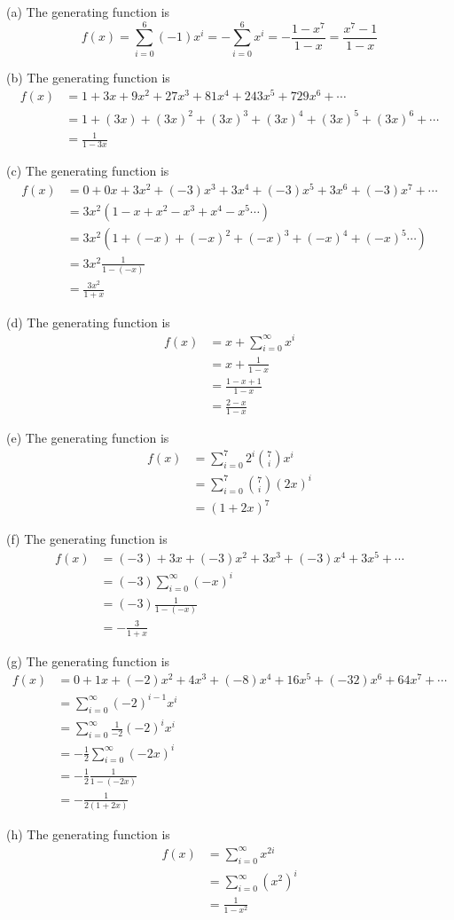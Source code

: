 
(a) The generating function is
\[
f(x)
= \sum_{i=0}^6 (-1)x^i
= -\sum_{i=0}^6 x^i
= -\frac{1 - x^7}{1 - x} 
= \frac{x^7 - 1}{1 - x} 
\]

(b) The generating function is
\begin{align*}
  f(x) &= 1 + 3x + 9x^2 + 27x^3 + 81x^4 + 243x^5 + 729x^6 + \cdots \\
  &= 1 + (3x) + (3x)^2 + (3x)^3 + (3x)^4 + (3x)^5 + (3x)^6 + \cdots \\
  &= \frac{1}{1 - 3x}
\end{align*}

(c) The generating function is
\begin{align*}
  f(x)
  &= 0 + 0x + 3x^2 + (-3)x^3 + 3x^4 + (-3)x^5 + 3x^6 + (-3)x^7 + \cdots\\
  &= 3x^2 (1 - x + x^2 - x^3 + x^4 - x^5 \cdots) \\
  &= 3x^2 (1 + (-x) + (-x)^2 + (-x)^3 + (-x)^4 + (-x)^5 \cdots) \\
  &= 3x^2 \frac{1}{1 - (-x)} \\
  &= \frac{3x^2}{1 + x} 
\end{align*}


(d) The generating function is
\begin{align*}
  f(x)
  &= x + \sum_{i=0}^\infty x^i \\
  &= x + \frac{1}{1 - x} \\
  &= \frac{1 - x + 1}{1 - x} \\
  &= \frac{2 - x}{1 - x}
\end{align*}

(e)
The generating function is
\begin{align*}
  f(x)
  &= \sum_{i=0}^7 2^i\binom{7}{i} x^i \\
  &= \sum_{i=0}^7 \binom{7}{i} (2x)^i \\
  &= (1 + 2x)^7
\end{align*}


(f)
The generating function is
\begin{align*}
  f(x)
  &= (-3) + 3x + (-3)x^2 + 3x^3 + (-3)x^4 + 3x^5 + \cdots \\
  &= (-3) \sum_{i=0}^\infty (-x)^i \\
  &= (-3) \frac{1}{1 - (-x)} \\
  &= - \frac{3}{1 + x} 
\end{align*}

(g)
The generating function is
\begin{align*}
  f(x)
  &= 0 + 1x + (-2)x^2 + 4x^3 + (-8)x^4 + 16x^5 + (-32)x^6 + 64x^7 + \cdots \\
  &= \sum_{i=0}^\infty (-2)^{i-1}x^i \\
  &= \sum_{i=0}^\infty \frac{1}{-2}(-2)^{i}x^i \\
  &= -\frac{1}{2} \sum_{i=0}^\infty (-2x)^i \\
  &= -\frac{1}{2} \frac{1}{1 - (-2x)} \\
  &= -\frac{1}{2(1 + 2x)} 
\end{align*}

(h)
The generating function is
\begin{align*}
  f(x)
  &= \sum_{i=0}^\infty x^{2i} \\
  &= \sum_{i=0}^\infty (x^2)^i \\
  &= \frac{1}{1 - x^2} 
\end{align*}
